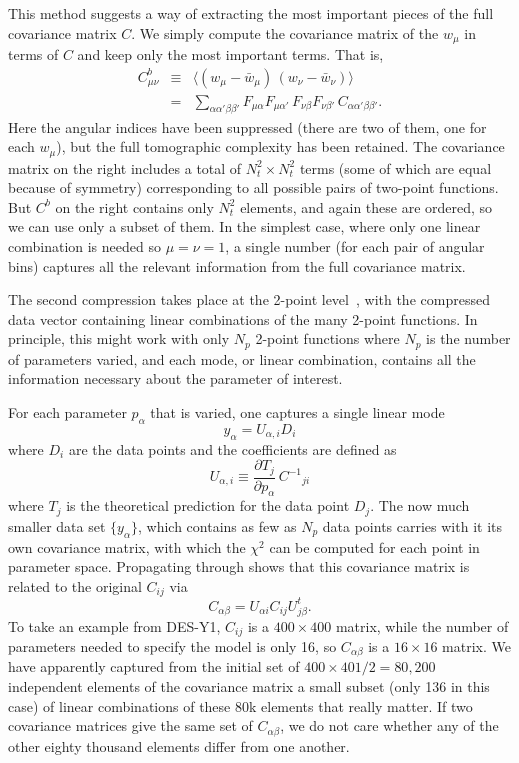 \documentclass[twocolumn]{\docclass}
\newcommand\be{\begin{equation}}
\newcommand\ee{\end{equation}}
\def\bea{\begin{eqnarray}}
\def\eea{\end{eqnarray}}
\def\svs{\nonumber\\}
\begin{document}
This method suggests a way of extracting the most important pieces of the full covariance matrix $C$. We simply compute the covariance matrix of the $w_{\mu}$ in terms of $C$ and keep only the most important terms. That is,
\bea
C^b_{\mu\nu} &\equiv& \langle (w_{\mu} -\bar w_\mu)\,(w_{\nu} -\bar w_\nu)\rangle
\svs
&=& \sum_{\alpha\alpha'\beta\beta'} F_{\mu\alpha}F_{\mu\alpha'}\, F_{\nu\beta}F_{\nu\beta'}\, C_{\alpha\alpha'\beta\beta'} .
\eea
Here the angular indices have been suppressed (there are two of them, one for each $w_\mu$), but the full tomographic complexity has been retained. The covariance matrix on the right includes a total of $N_t^2 \times N_t^2$ terms (some of which are equal because of symmetry) corresponding to all possible pairs of two-point functions. But $C^b$ on the right contains only $N_t^2$ elements, and again these are ordered, so we can use only a subset of them. In the simplest case, where only one linear combination is needed so $\mu=\nu=1$, a single number (for each pair of angular bins) captures all the relevant information from the full covariance matrix.

The second compression takes place at the 2-point level~\citep{Zablocki:2015zcm}, with the compressed data vector containing linear combinations of the many 2-point functions. In principle, this might work with only $N_p$ 2-point functions where $N_p$ is the number of parameters varied, and each mode, or linear combination, contains all the information necessary about the parameter of interest. 

For each parameter $p_\alpha$ that is varied, one captures a single linear mode
\be
y_\alpha = U_{\alpha,i} D_i
\ee
where $D_i$ are the data points and the coefficients are defined as
\be
U_{\alpha,i} \equiv \frac{\partial T_j}{\partial p_\alpha} \, C^{-1}{}_{ji}
\ee
where $T_j$ is the theoretical prediction for the data point $D_j$.
The now much smaller data set $\{y_\alpha\}$, which contains as few as $N_p$ data points carries with it its own covariance matrix, with which the $\chi^2$ can be computed for each point in parameter space. Propagating through shows that this covariance matrix is related to the original $C_{ij}$ via
\be
C_{\alpha\beta} = U_{\alpha i} C_{ij} U^t_{j\beta}.
\ee
To take an example from DES-Y1, $C_{ij}$ is a $400\times 400$ matrix, while the number of parameters needed to specify the model is only 16, so $C_{\alpha\beta}$ is a $16\times 16$ matrix. We have apparently captured from the initial set of $400\times 401/2=80,200$ independent elements of the covariance matrix a small subset (only 136 in this case) of linear combinations of these 80k elements that really matter. If two covariance matrices give the same set of $C_{\alpha\beta}$, we do not care whether any of the other eighty thousand elements differ from one another.
\end{document}
